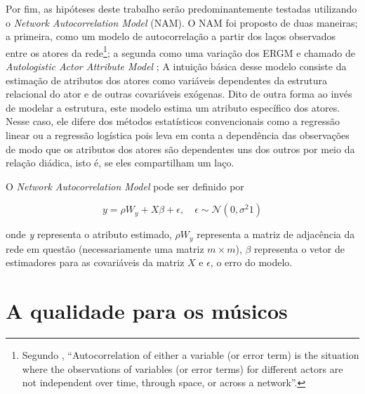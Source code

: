 \documentclass[a4paper, 12pt, openright, oneside, german, french, english, brazil]{abntex2}
\begin{document}
	Por fim, as hipóteses deste trabalho serão predominantemente testadas utilizando o \textit{Network Autocorrelation Model} (NAM). O NAM foi proposto de duas maneiras; a primeira, como um modelo de autocorrelação a partir dos laços observados entre os atores da rede\footnote{Segundo , ``Autocorrelation of either a variable (or error term) is the situation where the observations of variables (or error terms) for different actors are not independent over time, through space, or across a network''.}; a segunda como uma variação dos ERGM e chamado de \textit{Autologistic Actor Attribute Model} \cite{kashima2013acquisition,daraganova2013autologistic,daraganova_pattison_2013};
	A intuição básica desse modelo consiste da estimação de atributos dos atores como variáveis dependentes da estrutura relacional do ator e de outras covariáveis exógenas. Dito de outra forma ao invés de modelar a estrutura, este modelo estima um atributo específico dos atores. Nesse caso, ele difere dos métodos estatísticos convencionais como a regressão linear ou a regressão logística pois leva em conta a dependência das observações de modo que os atributos dos atores são dependentes uns dos outros por meio da relação diádica, isto é, se eles compartilham um laço.
	
	O \textit{Network Autocorrelation Model} pode ser definido por
	
	\begin{equation}\label{NAM}
	y = \rho W_y + X \beta + \epsilon, \quad \epsilon \sim \mathcal{N}(0, \sigma^2 1)
	\end{equation}
	
	onde \textit{y} representa o atributo estimado, $\rho W_y$ representa a matriz de adjacência da rede em questão (necessariamente uma matriz $m \times m$), $\beta$ representa o vetor de estimadores para as covariáveis da matriz $X$ e $\epsilon$, o erro do modelo.




	\chapter{A qualidade para os músicos}
	
\end{document}
